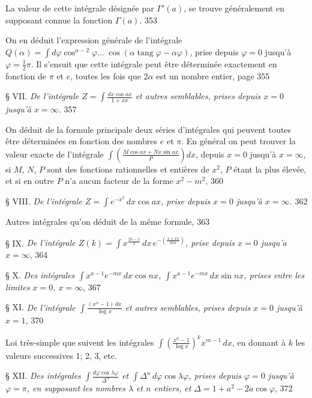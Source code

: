 \documentclass{article}
\begin{document}
La valeur de cette intégrale désignée par $\Gamma'(a)$, se trouve généralement en supposant connue la fonction $\Gamma(a)$. 353

On en déduit l'expression générale de l'intégrale $Q(\alpha)=\displaystyle\int d\varphi\cos^{\alpha-2}\varphi\ldots\ \cos(\alpha\operatorname{tang}\varphi-\alpha\varphi)$, prise depuis $\varphi=0$ jusqu'à $\varphi=\frac{1}{2}\pi$. Il s'ensuit que cette intégrale peut être déterminée exactement en fonction de $\pi$ et $e$, toutes les fois que $2\alpha$ est un nombre entier, page 355

§ VII. \emph{De l'intégrale $Z=\displaystyle\int\frac{dx\cos ax}{1+xx}$ et autres semblables, prises depuis $x=0$ jusqu'à $x=\infty$.} 357

On déduit de la formule principale deux séries d'intégrales qui peuvent toutes être déterminées en fonction des nombres $e$ et $\pi$. En général on peut trouver la valeur exacte de l'intégrale $\displaystyle\int\left(\frac{M\cos ax+Nx\sin ax}{P}\right)dx$, depuis $x=0$ jusqu'à $x=\infty$, si $M$, $N$, $P$ sont des fonctions rationnelles et entières de $x^{2}$, $P$ étant la plus élevée, et si en outre $P$ n'a aucun facteur de la forme $x^{2}-m^{2}$, 360

§ VIII. \emph{De l'intégrale $Z=\displaystyle\int e^{-x^{2}}\,dx\cos ax$, prise depuis $x=0$ jusqu'à $x=\infty$.} 362

Autres intégrales qu'on déduit de la même formule, 363

§ IX. \emph{De l'intégrale $Z(k)=\displaystyle\int x^{\frac{2k-1}{2}}\,dx\,e^{-\left(\frac{1+xx}{2nx}\right)}$, prise depuis $x=0$ jusqu'a $x=\infty$}, 364

§ X. \emph{Des intégrales $\displaystyle\int x^{a-1}e^{-mx}\,dx\cos nx$, $\displaystyle\int x^{a-1}e^{-mx}\,dx\sin nx$, prises entre les limites $x=0$, $x=\infty$}, 367

§ XI. \emph{De l'intégrale $\displaystyle\int\frac{(x^{n}-1)\,dx}{\log x}$ et autres semblables, prises depuis $x=0$ jusqu'à $x=1$}, 370

Loi très-simple que suivent les intégrales $\displaystyle\int\left(\frac{x^{n}-1}{\log x}\right)^{k}x^{m-1}\,dx$, en donnant à $k$ les valeurs successives 1; 2, 3, etc.

§ XII. \emph{Des intégrales $\displaystyle\int\frac{d\varphi\cos\lambda\varphi}{\Delta^{n}}$ et $\displaystyle\int\Delta^{n}\,d\varphi\cos\lambda\varphi$, prises depuis $\varphi=0$ jusqu'à $\varphi=\pi$, en supposant les nombres $\lambda$ et $n$ entiers, et $\Delta=1+a^{2}-2a\cos\varphi$}, 372
\end{document}
